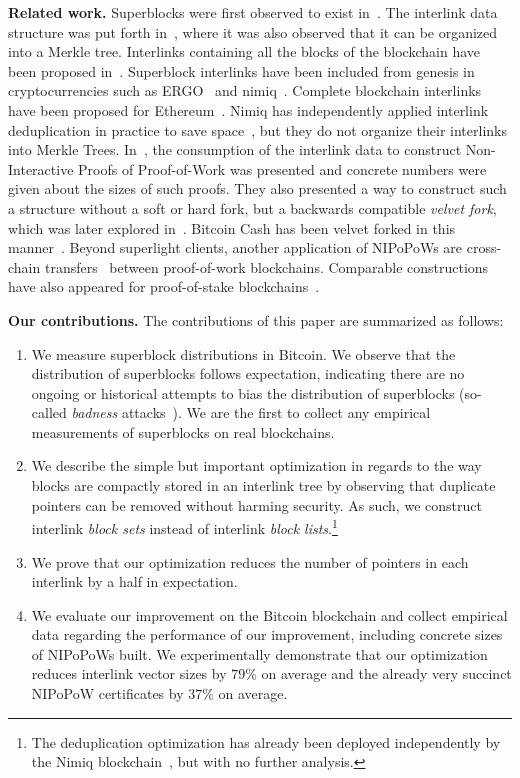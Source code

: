 \noindent
\textbf{Related work.}
Superblocks were first observed to exist in~\cite{highway}.  The interlink data
structure was put forth in~\cite{popow}, where it was also observed that it can
be organized into a Merkle tree. Interlinks containing all the blocks of the
blockchain have been proposed in~\cite{flyclient}. Superblock interlinks have
been included from genesis in cryptocurrencies such as ERGO~\cite{ergo} and
nimiq~\cite{nimiq}. Complete blockchain interlinks have been proposed for Ethereum~\cite{eip210}. Nimiq has independently applied interlink deduplication in practice to save space~\cite{nimiq-dev-ref}, but they do not organize their
interlinks into Merkle Trees. In~\cite{nipopows}, the consumption of the interlink data to
construct Non-Interactive Proofs of Proof-of-Work was presented and concrete
numbers were given about the sizes of such proofs. They also presented a way to
construct such a structure without a soft or hard fork, but a backwards
compatible \emph{velvet fork}, which was later explored in~\cite{velvet}.
Bitcoin Cash has been velvet forked in this manner~\cite{gtklocker}. Beyond
superlight clients, another
application of NIPoPoWs are cross-chain transfers~\cite{pow-sidechains}
between proof-of-work blockchains. Comparable
constructions have also appeared for proof-of-stake
blockchains~\cite{pos-sidechains}.

\noindent
\textbf{Our contributions.} The contributions of this paper are summarized as
follows:

\begin{enumerate}
  \item We measure superblock distributions in Bitcoin. We observe that the
        distribution of superblocks follows expectation, indicating there are no
        ongoing or historical attempts to bias the distribution of superblocks
        (so-called \emph{badness} attacks~\cite{nipopows}). We are the first to
        collect any empirical measurements of superblocks on real blockchains.
  \item We describe the simple but important optimization in regards to the way
        blocks are compactly stored in an interlink tree by observing that
        duplicate pointers can be removed without harming security. As such, we
        construct interlink \emph{block sets} instead of interlink \emph{block
        lists}.\footnote{The deduplication optimization has already been deployed
        independently by the Nimiq blockchain~\cite{nimiq-dev-ref}, but with no
        further analysis.}
  \item We prove that our optimization reduces the number of pointers in each
        interlink by a half in expectation.
  \item We evaluate our improvement on the Bitcoin blockchain and collect
        empirical data regarding the performance of our improvement, including
        concrete sizes of NIPoPoWs built. We experimentally demonstrate that our
        optimization reduces interlink vector sizes by $79\%$ on average and
        the already very succinct NIPoPoW certificates by $37\%$ on average.
\end{enumerate}

